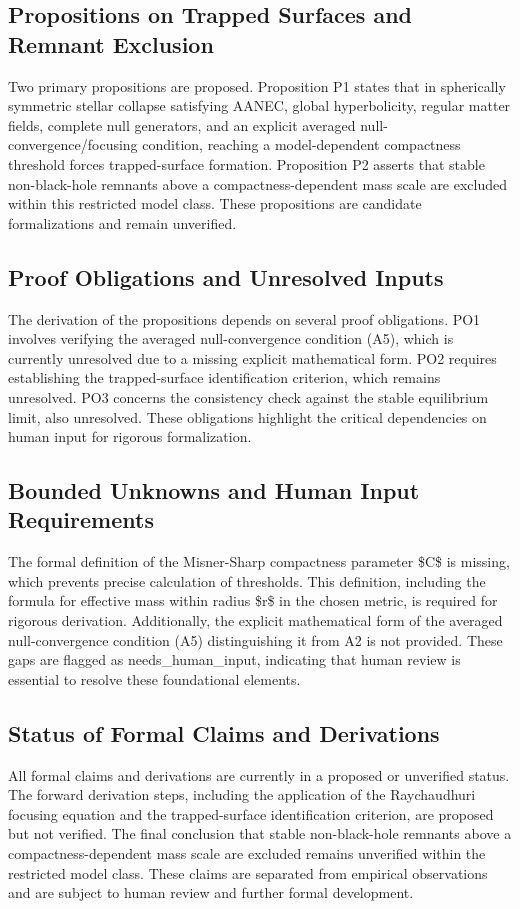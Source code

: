 \documentclass[conference]{IEEEtran}
\begin{document}
\subsection{Propositions on Trapped Surfaces and Remnant Exclusion}
Two primary propositions are proposed. Proposition P1 states that in spherically symmetric stellar collapse satisfying AANEC, global hyperbolicity, regular matter fields, complete null generators, and an explicit averaged null-convergence/focusing condition, reaching a model-dependent compactness threshold forces trapped-surface formation. Proposition P2 asserts that stable non-black-hole remnants above a compactness-dependent mass scale are excluded within this restricted model class. These propositions are candidate formalizations and remain unverified.

\subsection{Proof Obligations and Unresolved Inputs}
The derivation of the propositions depends on several proof obligations. PO1 involves verifying the averaged null-convergence condition (A5), which is currently unresolved due to a missing explicit mathematical form. PO2 requires establishing the trapped-surface identification criterion, which remains unresolved. PO3 concerns the consistency check against the stable equilibrium limit, also unresolved. These obligations highlight the critical dependencies on human input for rigorous formalization.

\subsection{Bounded Unknowns and Human Input Requirements}
The formal definition of the Misner-Sharp compactness parameter \$C\$ is missing, which prevents precise calculation of thresholds. This definition, including the formula for effective mass within radius \$r\$ in the chosen metric, is required for rigorous derivation. Additionally, the explicit mathematical form of the averaged null-convergence condition (A5) distinguishing it from A2 is not provided. These gaps are flagged as needs\_human\_input, indicating that human review is essential to resolve these foundational elements.

\subsection{Status of Formal Claims and Derivations}
All formal claims and derivations are currently in a proposed or unverified status. The forward derivation steps, including the application of the Raychaudhuri focusing equation and the trapped-surface identification criterion, are proposed but not verified. The final conclusion that stable non-black-hole remnants above a compactness-dependent mass scale are excluded remains unverified within the restricted model class. These claims are separated from empirical observations and are subject to human review and further formal development.
\end{document}
